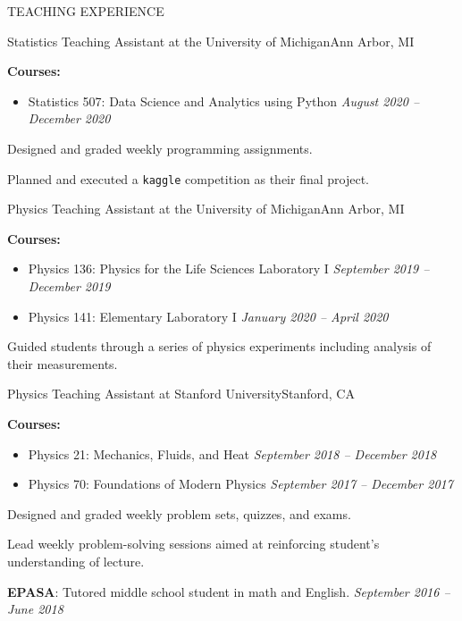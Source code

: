 \begin{rSection}{TEACHING EXPERIENCE} 
%
\begin{rSubsection}{Statistics Teaching Assistant at the University of Michigan}{Ann Arbor, MI}{}{}
\item \textbf{Courses:}
%
    \begin{itemize}[itemsep=-0.4em]
        \vspace*{-0.5em}
        \item Statistics 507: Data Science and Analytics using Python \hfill \textit{August 2020 -- December 2020}
    \end{itemize}

\item Designed and graded weekly programming assignments.
\item Planned and executed a \texttt{kaggle} competition as their final project.
%
\end{rSubsection} 
%
\begin{rSubsection}{Physics Teaching Assistant at the University of Michigan}{Ann Arbor, MI}{}{}
\item \textbf{Courses:}
%
    \begin{itemize}[itemsep=-0.4em]
        \vspace*{-0.5em}
        \item Physics 136: Physics for the Life Sciences Laboratory I \hfill \textit{September 2019 -- December 2019}
        \item Physics 141: Elementary Laboratory I \hfill \textit{January 2020 -- April 2020}
    \end{itemize}
%
\item Guided students through a series of physics experiments including analysis of their measurements.
\end{rSubsection} 
%
\begin{rSubsection}{Physics Teaching Assistant at Stanford University}{Stanford, CA}{}{}
\item \textbf{Courses:}
%
    \begin{itemize}[itemsep=-0.5em]
        \vspace*{-0.5em}
        \item Physics 21: Mechanics, Fluids, and Heat \hfill \textit{September 2018 -- December 2018}
        \item Physics 70: Foundations of Modern Physics \hfill \textit{September 2017 -- December 2017}
    \end{itemize}
%
\item Designed and graded weekly problem sets, quizzes, and exams. 
\item Lead weekly problem-solving sessions aimed at reinforcing student's understanding of lecture. 
%
\end{rSubsection} 
%
\textbf{EPASA}: Tutored middle school student in math and English. \hfill {\em September 2016 -- June 2018}


\end{rSection}
